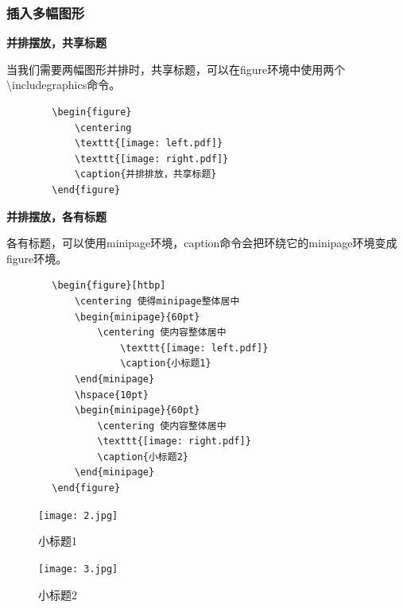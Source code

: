 \documentclass[16pt]{article}
\begin{document}
\subsubsection{插入多幅图形}
    \textbf{并排摆放，共享标题} \par
    当我们需要两幅图形并排时，共享标题，可以在figure环境中使用两个\textbackslash includegraphics命令。 \par
    \begin{lstlisting}
        \begin{figure}
            \centering
            \texttt{[image: left.pdf]}
            \texttt{[image: right.pdf]}
            \caption{并排排放，共享标题}
        \end{figure}
    \end{lstlisting}
    \textbf{并排摆放，各有标题} \par
    各有标题，可以使用minipage环境，caption命令会把环绕它的minipage环境变成figure环境。\par
    \begin{lstlisting}
        \begin{figure}[htbp]
            \centering 使得minipage整体居中
            \begin{minipage}{60pt}
                \centering 使内容整体居中
                    \texttt{[image: left.pdf]}
                    \caption{小标题1}
            \end{minipage}
            \hspace{10pt}
            \begin{minipage}{60pt}
                \centering 使内容整体居中
                \texttt{[image: right.pdf]}
                \caption{小标题2}
            \end{minipage}
        \end{figure}
    \end{lstlisting} \par
    \begin{figure}[htbp]
        \centering %
        \begin{minipage}{200pt}
            \centering %
                \texttt{[image: 2.jpg]}
                \caption{小标题1}
        \end{minipage}
        \hspace{10pt}
        \begin{minipage}{200pt}
            \centering %
            \texttt{[image: 3.jpg]}
            \caption{小标题2}
        \end{minipage}
    \end{figure}
\end{document}
